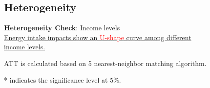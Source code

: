 \documentclass{beamer}	%
\theoremstyle{plain}
\theoremstyle{definition}
\theoremstyle{remark}
\numberwithin{equation}{section}
\begin{document}
\subsection {Heterogeneity}
\begin{frame}
	\textbf{Heterogeneity Check}: Income levels \\
	\underline{Energy intake impacts show an \textcolor{red}{U-shape} curve among different} \\ \underline{income levels.} \\
	\centering
	\begin{table}[]
		\caption{Effects of Internet Access on Nutrition Consumption: Income Levels (Change\%)}
		\begin{tablenotes}
			\item \tiny{ATT is calculated based on 5 nearest-neighbor matching algorithm.}
			\item \tiny{* indicates the significance level at 5\%.}
		\end{tablenotes}		
	\end{table}
\end{frame}
\end{document}

